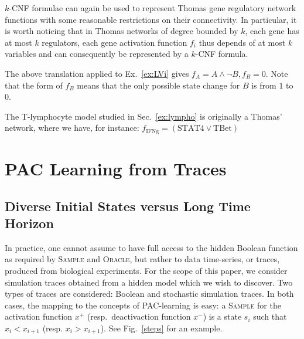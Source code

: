 \documentclass{llncs}
\newif\ifcomments%
\newcommand{\francois}[1]{\ifcomments\textcolor{blue}{#1}\fi}
\begin{document}
$k$-CNF formulae can again be used to represent Thomas gene regulatory network functions with some reasonable restrictions on their connectivity.
In particular, it is worth noticing that in Thomas networks of degree bounded by $k$,
each gene has at most $k$ regulators, each gene activation function $f_i$ thus depends of at most $k$ variables
and can consequently be represented by a $k$-CNF formula.

\begin{example}
   The above translation applied to
   Ex.~\ref{ex:LVi} gives \(f_A = A \wedge\neg B, f_B = 0\).
   Note that the form of $f_B$ means that the only possible state change
   for $B$ is from $1$ to $0$. 
\end{example}

\begin{example}
   The T-lymphocyte model studied in Sec.~\ref{ex:lympho} is originally a Thomas' network, where we have, for
   instance: \(f_\text{IFNg}=(\text{STAT4}\vee \text{TBet})\)
\end{example}

\section{PAC Learning from Traces} %

\francois{Les anciennes sections 4.1 et 4.2 (4.3-4.4) sont a reecrire completement dans les nouvelles section 4.1 et 4.2. Le discours doit etre scientifique sur les traces de simulation que nous considerons sans tirer de conclusions prematurees sur les traces ``reelles'' ``en pratique'' que nous ne considerons pas.}

\subsection{Diverse Initial States versus Long Time Horizon}

In practice, one cannot assume to have full access to the hidden Boolean function as required by
\textsc{Sample} and \textsc{Oracle}, but rather to data time-series, or traces,
produced from biological experiments. 
For the scope of this paper, we consider simulation traces obtained from a hidden model
which we wish to discover.
Two types of traces are considered: Boolean and stochastic simulation traces.
In both cases, the mapping to the concepts of PAC-learning is easy: a \textsc{Sample}
for the activation function $x^+$ (resp.\ deactivaction function $x^-$) is a
state $s_i$ such that $x_i<x_{i+1}$ (resp. $x_i>x_{i+1}$).
See Fig.~\ref{steps} for an example.
\end{document}
